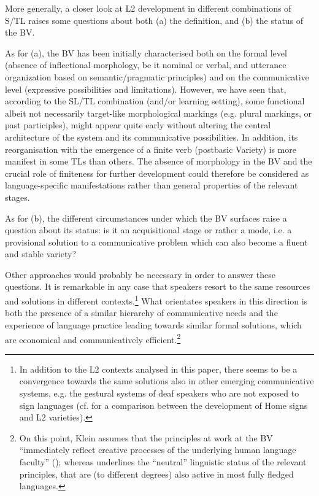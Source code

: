 \documentclass[output=paper]{langscibook}
\begin{document}
More generally, a closer look at L2 development in different combinations of S/TL raises some questions about both (a) the definition, and (b) the status of the BV. 

As for (a), the BV has been initially characterised both on the formal level (absence of inflectional morphology, be it nominal or verbal, and utterance organization based on semantic/pragmatic principles) and on the communicative level (expressive possibilities and limitations). However, we have seen that, according to the SL/TL combination (and\slash or learning setting), some functional albeit not necessarily target-like morphological markings (e.g. plural markings, or past participles), might appear quite early without altering the central architecture of the system and its communicative possibilities. In addition, its reorganisation with the emergence of a finite verb (postbasic Variety) is more manifest in some TLs than others. The absence of morphology in the BV and the crucial role of finiteness for further development could therefore be considered as language-specific manifestations rather than general properties of the relevant stages.

As for (b), the different circumstances under which the BV surfaces raise a question about its status: is it an acquisitional stage or rather a mode, i.e. a provisional solution to a communicative problem which can also become a fluent and stable variety?      

Other approaches would probably be necessary in order to answer these questions. It is remarkable in any case that speakers resort to the same resources and solutions in different contexts.\footnote{In addition to the L2 contexts analysed in this paper, there seems to be a convergence towards the same solutions also in other emerging communicative systems, e.g. the gestural systems of deaf speakers who are not exposed to sign languages (cf. \citealt{Benazzo2009} for a comparison between the development of Home signs and L2 varieties).} What orientates speakers in this direction is both the presence of a similar hierarchy of communicative needs and the experience of language practice leading towards similar formal solutions, which are economical and communicatively efficient.\footnote{On this point, Klein assumes that the principles at work at the BV “immediately reflect creative processes of the underlying human language faculty” (\citeyear[93]{Klein2001}); whereas \citet{Perdue2006} underlines the “neutral” linguistic status of the relevant principles, that are (to different degrees) also active in most fully fledged languages.}
\end{document}
